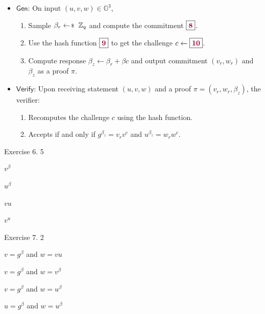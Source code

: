 \documentclass[../lecture-notes-148x210.tex]{subfiles}
\begin{document}
\begin{tcolorbox}[breakable, colback=gray!10!white,fonttitle=\bfseries,colframe=purple!80!black,title=Exercises 6-10. Non-Interactive Chaum-Pedersen Protocol.]
    \begin{itemize}
        \item $\mathsf{Gen}$: On input $(u,v,w) \in \mathbb{G}^3$, 
        \begin{enumerate}
            \item Sample $\beta_r \leftarrowS \mathbb{Z}_q$ and compute the commitment $\boxed{\textcolor{purple!80!black}{\textbf{8}}}$.
            \item Use the hash function $\boxed{\textcolor{purple!80!black}{\textbf{9}}}$ to get the challenge $c \gets \boxed{\textcolor{purple!80!black}{\textbf{10}}}$.
            \item Compute response $\beta_z \gets \beta_r + \beta c$ and output commitment $(v_r,w_r)$ and $\beta_z$ as a proof $\pi$.
        \end{enumerate}
        \item $\mathsf{Verify}$: Upon receiving statement $(u,v,w)$ and a proof $\pi=(v_r,w_r,\beta_z)$, the verifier:
        \begin{enumerate}
            \item Recomputes the challenge $c$ using the hash function.
            \item Accepts if and only if $g^{\beta_z} = v_r v^c$ and $u^{\beta_z} = w_r w^c$.
        \end{enumerate}
    \end{itemize}
\end{tcolorbox}

\vspace{-1mm}

\begin{xexercise}
    {Exercise 6.}
    {}
    {5}
    {
        \item $v^{\beta}$
        \item $u^{\beta}$
        \item $vu$
        \item $v^u$
    }
\end{xexercise}

\begin{xexercise}
    {Exercise 7.}
    {}
    {2}
    {
        \item $v = g^{\beta}$ and $w = vu$
        \item $v = g^{\beta}$ and $w = v^{\beta}$
        \item $v = g^{\beta}$ and $w = u^{\beta}$
        \item $u = g^{\beta}$ and $w = u^{\beta}$
    }
\end{xexercise}
\end{document}

